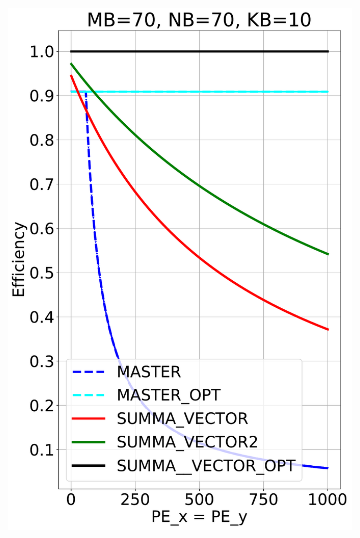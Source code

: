 \begin{figure}[t!]
\begin{subfigure}{0.32\columnwidth}
  \end{subfigure}
  \hfill
  \begin{subfigure}{0.32\columnwidth}
    \includegraphics[width=\linewidth]{figures/efficiency_cost_70_70_10.pdf}
  \end{subfigure}
  \hfill
  \begin{subfigure}{0.32\columnwidth}

\end{subfigure}
\end{figure}
